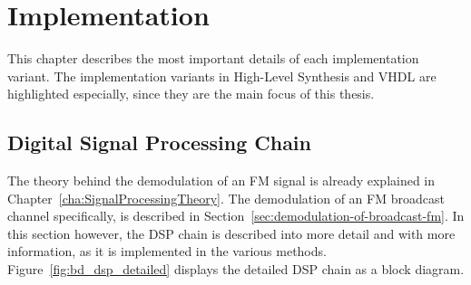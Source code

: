 \chapter{Implementation}
\label{cha:Implementation}

This chapter describes the most important details of each implementation variant.
The implementation variants in High-Level Synthesis and VHDL are highlighted especially, since they are the main focus of this thesis.

\section{Digital Signal Processing Chain}
\label{sec:impl:dsp-chain}

The theory behind the demodulation of an FM signal is already explained in Chapter~\ref{cha:SignalProcessingTheory}.
The demodulation of an FM broadcast channel specifically, is described in Section~\ref{sec:demodulation-of-broadcast-fm}.
In this section however, the DSP chain is described into more detail and with more information, as it is implemented in the various methods.\\

\noindent
Figure~\ref{fig:bd_dsp_detailed} displays the detailed DSP chain as a block diagram.\\


